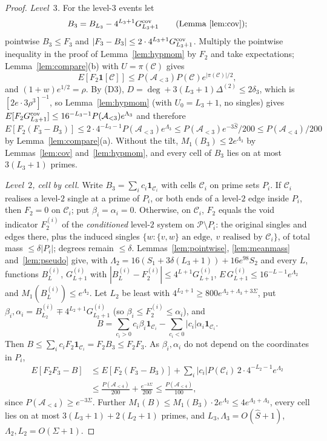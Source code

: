 \documentclass[11pt,reqno]{amsart}
\theoremstyle{definition}
\begin{document}
\begin{proof}
\emph{Level~$3$.}  For the level-$3$ events let
\[
 B_3=B_{L_3}-4^{L_3+1}G^{\rm cov}_{L_3+1}\qquad\text{(Lemma~\ref{lem:cov});}
\]
pointwise $B_3\le F_3$ and $|F_3-B_3|\le2\cdot4^{L_3+1}G^{\rm cov}_{L_3+1}$.  Multiply the pointwise
inequality in the proof of Lemma~\ref{lem:hypmom} by $F_2$ and take
expectations; Lemma~\ref{lem:compare}(b) with $U=\pi(\mathcal C)$ gives
\[
 E[F_2\mathbf 1[\mathcal C]]\le P(\mathcal A_{<3})P(\mathcal C)e^{|\pi(\mathcal C)|/2},
\]
and $(1+w)e^{1/2}=\rho$.  By (D3),
$D=\deg+3(L_3+1)\Delta^{(2)}\le2\delta_3$, which is $[2e\cdot3\rho^3]^{-1}$, so
Lemma~\ref{lem:hypmom} (with $U_0=L_3+1$, no singles) gives
$E[F_2G^{\rm cov}_{L_3+1}]\le16^{-L_3-1}P(\mathcal A_{<3})e^{\Lambda_3}$ and therefore
\[
 E[F_2(F_3-B_3)]\le2\cdot4^{-L_3-1}P(\mathcal A_{<3})e^{\Lambda_3}\le P(\mathcal A_{<3})e^{-3\hat S}/200\le P(\mathcal A_{<4})/200
\]
by Lemma~\ref{lem:compare}(a).  Without the tilt, $M_1(B_3)\le2e^{\Lambda_3}$ by
Lemmas~\ref{lem:cov} and~\ref{lem:hypmom}, and every cell of $B_3$ lies on at
most $3(L_3+1)$ primes.

\emph{Level~$2$, cell by cell.}  Write $B_3=\sum_ic_i\mathbf 1_{\mathcal C_i}$ with cells
$\mathcal C_i$ on prime sets $P_i$.  If $\mathcal C_i$ realises a level-$2$ single at a prime of
$P_i$, or both ends of a level-$2$ edge inside $P_i$, then $F_2=0$ on $\mathcal C_i$;
put $\beta_i=\alpha_i=0$.  Otherwise, on $\mathcal C_i$, $F_2$ equals the void
indicator $F_2^{(i)}$ of the \emph{conditioned} level-$2$ system on
$\mathcal P\setminus P_i$: the original singles and edges there, plus the induced
singles $\{w:\{v,w\}\text{ an edge},\ v\text{ realised by }\mathcal C_i\}$, of total
mass $\le\delta|P_i|$; degrees remain $\le\delta$.  Lemmas~\ref{lem:pointwise},
\ref{lem:meanmass} and~\ref{lem:pseudo} give, with
$\Lambda_2=16(S_1+3\delta(L_3+1))+16e^{98}S_2$ and every $L$, functions
$B^{(i)}_L$, $G^{(i)}_{L+1}$ with $|B^{(i)}_L-F_2^{(i)}|\le4^{L+1}G^{(i)}_{L+1}$,
$E\,G^{(i)}_{L+1}\le16^{-L-1}e^{\Lambda_2}$ and $M_1(B^{(i)}_L)\le e^{\Lambda_2}$.  Let
$L_2$ be least with $4^{L_2+1}\ge800e^{\Lambda_2+\Lambda_3+3\Sigma}$, put
$\beta_i,\alpha_i=B^{(i)}_{L_2}\mp4^{L_2+1}G^{(i)}_{L_2+1}$ (so
$\beta_i\le F_2^{(i)}\le\alpha_i$), and
\[
 B=\sum_{c_i>0}c_i\beta_i\mathbf 1_{\mathcal C_i}-\sum_{c_i<0}|c_i|\alpha_i\mathbf 1_{\mathcal C_i}.
\]
Then $B\le\sum_ic_iF_2\mathbf 1_{\mathcal C_i}=F_2B_3\le F_2F_3$.  As $\beta_i,\alpha_i$ do
not depend on the coordinates in $P_i$,
\begin{align*}
 E[F_2F_3-B]&\le E[F_2(F_3-B_3)]+\sum_i|c_i|P(\mathcal C_i)\,2\cdot4^{-L_2-1}e^{\Lambda_2}\\
 &\le\frac{P(\mathcal A_{<4})}{200}+\frac{e^{-3\Sigma}}{200}\le\frac{P(\mathcal A_{<4})}{100},
\end{align*}
since $P(\mathcal A_{<4})\ge e^{-3\Sigma}$.  Further
$M_1(B)\le M_1(B_3)\cdot2e^{\Lambda_2}\le4e^{\Lambda_2+\Lambda_3}$, every cell lies
on at most $3(L_3+1)+2(L_2+1)$ primes, and $L_3,\Lambda_3=O(\hat S+1)$,
$\Lambda_2,L_2=O(\Sigma+1)$.


\end{proof}
\end{document}
